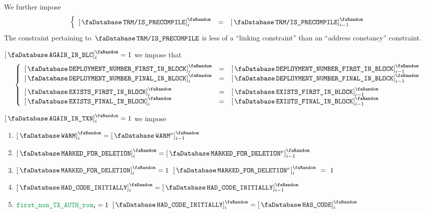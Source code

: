 \begin{description}
		We further impose
		\[
			\left\{ \begin{array}{lclr}
				\order{\accTrmIsPrecompile}_{i}   & = & \order{\accTrmIsPrecompile} _{i - 1} \\
			\end{array} \right.
		\]
		\saNote{}
		The constraint pertaining to $\accTrmIsPrecompile$ is less of a ``linking constraint''
		than an ``address constancy'' constraint.

	\item[\underline{At the block level:}]
		\If $\accAgainInBlock_{i} = 1$
		\Then we impose that
		\[
			\left\{ \begin{array}{lcl}
				\order{\accDeploymentNumberFirstInBlock} _{i} & = & \order{\accDeploymentNumberFirstInBlock} _{i - 1}              \\
				\order{\accDeploymentNumberFinalInBlock} _{i} & = & \order{\accDeploymentNumberFinalInBlock} _{i - 1} \vspace{2mm} \\
				\order{\accExistenceFirstInBlock}        _{i} & = & \order{\accExistenceFirstInBlock}        _{i - 1}              \\
				\order{\accExistenceFinalInBlock}        _{i} & = & \order{\accExistenceFinalInBlock}        _{i - 1}              \\
			\end{array} \right.
		\]
	\item[\underline{At the transaction level:}]
		\If $\accAgainInTransaction_{i} = 1$
		\Then we impose
		\begin{enumerate}
			\item $\order{\accWarmth}            _{i} = \order{\accWarmth\new}            _{i - 1}$
			\item $\order{\accMarkedForDeletion} _{i} = \order{\accMarkedForDeletion\new} _{i - 1}$
			\item\label{hub: consistency: account: linking at the transaction level: marked for selfdestruct is monotonous}
				\If $\order{\accMarkedForDeletion}_{i} = 1$ \Then $\order{\accMarkedForDeletion\new}_{i}~=~1$
			\item\label{hub: consistency: account: transaction constancy of "account had code initially"}
				$\order{\accHadCodeInitially} _{i} = \order{\accHadCodeInitially} _{i - 1}$
			\item\label{hub: consistency: account: setting "account had code initially" at first non TXAUTH row}
				\If $\locFirstNonTxAuthRow _{i} = 1$ \Then $\order{\accHadCodeInitially} _{i} = \order{\accHasCode} _{i}$

\end{enumerate}
\end{description}
